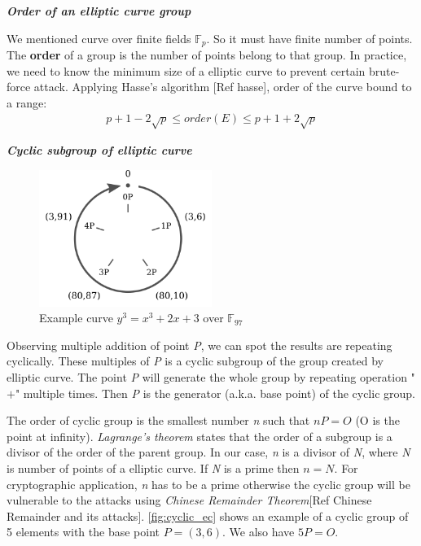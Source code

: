 \bigskip
{\textit {\textbf{Order of an elliptic curve group}}}

We mentioned curve over finite fields $\mathbb{F}_{p}$. So it must have finite number of points.
The {\bf order} of a group is the number of points belong to that group.
In practice, we need to know the minimum size of a elliptic curve to prevent certain brute-force attack.
Applying Hasse's algorithm [Ref hasse], order of the curve bound to a range:\medskip
\begin{align*}
  p + 1 - 2\sqrt{p} \leq order(E) \leq p + 1 + 2\sqrt{p}
\end{align*}

\bigskip
{\textit {\textbf{Cyclic subgroup of elliptic curve}}}
\begin{figure}[ht!]
  \centering
  \includegraphics[width=0.5\textwidth]{images/cyclic_ec.png}
  \caption[Example curve $y^3=x^3+2x+3$]{Example curve $y^3=x^3+2x+3$ over $\mathbb{F}_{97}$}
  \label{fig:cyclic_ec}
\end{figure}

Observing multiple addition of point \emph{P}, we can spot the results are repeating cyclically.
These multiples of \emph{P} is a cyclic subgroup of the group created by elliptic curve.
The point \emph{P} will generate the whole group by repeating operation "$+$" multiple times.
Then \emph{P} is the generator (a.k.a. base point) of the cyclic group.

The order of cyclic group is the smallest number \emph{n} such that $nP = O$ (O is the point at infinity).
\emph{Lagrange's theorem} states that the order of a subgroup is a divisor of the order of the parent group.
In our case, \emph{n} is a divisor of \emph{N}, where \emph{N} is number of points of a elliptic curve.
If \emph{N} is a prime then $n = N$.
For cryptographic application, \emph{n} has to be a prime otherwise the cyclic group will be vulnerable to the attacks using \emph{Chinese Remainder Theorem}[Ref Chinese Remainder and its attacks].
\autoref{fig:cyclic_ec} shows an example of a cyclic group of 5 elements with the base point $P = (3,6)$.
We also have $5P = O$.


